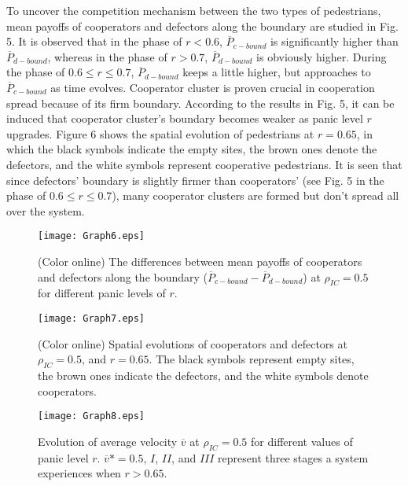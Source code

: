 \documentclass[%
 reprint,
 amsmath,amssymb,
 aps,
]{revtex4-1}
\begin{document}
To uncover the competition mechanism between the two types of pedestrians, mean payoffs of cooperators and defectors along the boundary are studied in Fig. 5. It is observed that in the phase of $r<0.6$, $\overline{P}_{c-bound}$ is significantly higher than $\overline{P}_{d-bound}$, whereas in the phase of $r >0.7$, $\overline{P}_{d-bound}$ is obviously higher. During the phase of $0.6 \leq r \leq 0.7$,  $\overline{P}_{d-bound}$ keeps a little higher, but approaches to $\overline{P}_{c-bound}$ as time evolves. Cooperator cluster is proven crucial in cooperation spread because of its firm boundary. According to the results in Fig. 5, it can be induced that cooperator cluster's boundary becomes weaker as panic level $r$ upgrades. Figure 6 shows the spatial evolution of pedestrians at $r=0.65$, in which the black symbols indicate the empty sites, the brown ones denote the defectors, and the white symbols represent cooperative pedestrians. It is seen that since defectors' boundary is slightly firmer than cooperators' (see Fig. 5 in the phase of $0.6 \leq r \leq 0.7$), many cooperator clusters are formed but don't spread all over the system.

\begin{figure}
\centerline{\texttt{[image: Graph6.eps]}}
\caption{ (Color online) The differences between mean payoffs of cooperators and defectors along the boundary ($\overline{P}_{c-bound}-\overline{P}_{d-bound}$) at $\rho_{IC}=0.5$ for different panic levels of $r$. }\label{afoto}
\end{figure}


\begin{figure}
\centerline{\texttt{[image: Graph7.eps]}}
\caption{ (Color online) Spatial evolutions of cooperators and defectors at $\rho_{IC}=0.5$, and $r=0.65$. The black symbols represent empty sites, the brown ones indicate the defectors, and the white symbols denote cooperators. }\label{afoto}
\end{figure}

\begin{figure}
\centerline{\texttt{[image: Graph8.eps]}}
\caption{Evolution of average velocity $\overline{v}$ at $\rho_{IC}=0.5$ for different values of panic level $r$. $\overline{v}*=0.5$, $I$, $II$, and $III$ represent three stages a system experiences when $r >0.65$. }\label{afoto}
\end{figure}
\end{document}
